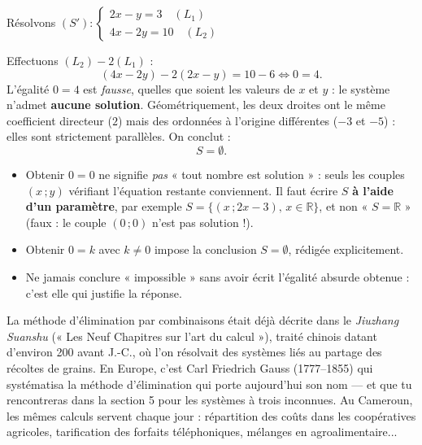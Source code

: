 \documentclass[11pt]{article}
\begin{document}
\begin{exemplebox}[Aucune solution : aboutir à $0 = k$ avec $k \neq 0$]
Résolvons $(S') : \begin{cases} 2x - y = 3 \quad (L_1) \\ 4x - 2y = 10 \quad (L_2) \end{cases}$

Effectuons $(L_2) - 2(L_1)$ :
\[
(4x - 2y) - 2(2x - y) = 10 - 6 \iff 0 = 4.
\]
L'égalité $0 = 4$ est \emph{fausse}, quelles que soient les valeurs de $x$ et $y$ : le système n'admet \textbf{aucune solution}. Géométriquement, les deux droites ont le même coefficient directeur ($2$) mais des ordonnées à l'origine différentes ($-3$ et $-5$) : elles sont strictement parallèles. On conclut :
\[
S = \emptyset.
\]
\end{exemplebox}

\begin{attention}
\begin{itemize}
\item Obtenir $0 = 0$ ne signifie \emph{pas} « tout nombre est solution » : seuls les couples $(x\,;y)$ vérifiant l'équation restante conviennent. Il faut écrire $S$ \textbf{à l'aide d'un paramètre}, par exemple $S = \{(x\,;2x-3),\, x \in \mathbb{R}\}$, et non « $S = \mathbb{R}$ » (faux : le couple $(0\,;0)$ n'est pas solution !).
\item Obtenir $0 = k$ avec $k \neq 0$ impose la conclusion $S = \emptyset$, rédigée explicitement.
\item Ne jamais conclure « impossible » sans avoir écrit l'égalité absurde obtenue : c'est elle qui justifie la réponse.
\end{itemize}
\end{attention}

\begin{savaistu}
La méthode d'élimination par combinaisons était déjà décrite dans le \emph{Jiuzhang Suanshu} (« Les Neuf Chapitres sur l'art du calcul »), traité chinois datant d'environ 200 avant J.-C., où l'on résolvait des systèmes liés au partage des récoltes de grains. En Europe, c'est Carl Friedrich Gauss (1777--1855) qui systématisa la méthode d'élimination qui porte aujourd'hui son nom — et que tu rencontreras dans la section 5 pour les systèmes à trois inconnues. Au Cameroun, les mêmes calculs servent chaque jour : répartition des coûts dans les coopératives agricoles, tarification des forfaits téléphoniques, mélanges en agroalimentaire...
\end{savaistu}
\end{document}
